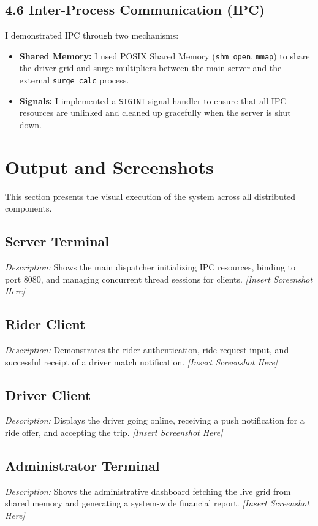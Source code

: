 \documentclass[12pt]{article}
\begin{document}
\subsection{4.6 Inter-Process Communication (IPC)}
I demonstrated IPC through two mechanisms:
\begin{itemize}
    \item \textbf{Shared Memory:} I used POSIX Shared Memory (\texttt{shm\_open}, \texttt{mmap}) to share the driver grid and surge multipliers between the main server and the external \texttt{surge\_calc} process.
    \item \textbf{Signals:} I implemented a \texttt{SIGINT} signal handler to ensure that all IPC resources are unlinked and cleaned up gracefully when the server is shut down.
\end{itemize}

\section{Output and Screenshots}
This section presents the visual execution of the system across all distributed components.

\subsection{Server Terminal}
\textit{Description:} Shows the main dispatcher initializing IPC resources, binding to port 8080, and managing concurrent thread sessions for clients.
\textit{[Insert Screenshot Here]}

\subsection{Rider Client}
\textit{Description:} Demonstrates the rider authentication, ride request input, and successful receipt of a driver match notification.
\textit{[Insert Screenshot Here]}

\subsection{Driver Client}
\textit{Description:} Displays the driver going online, receiving a push notification for a ride offer, and accepting the trip.
\textit{[Insert Screenshot Here]}

\subsection{Administrator Terminal}
\textit{Description:} Shows the administrative dashboard fetching the live grid from shared memory and generating a system-wide financial report.
\textit{[Insert Screenshot Here]}
\end{document}
